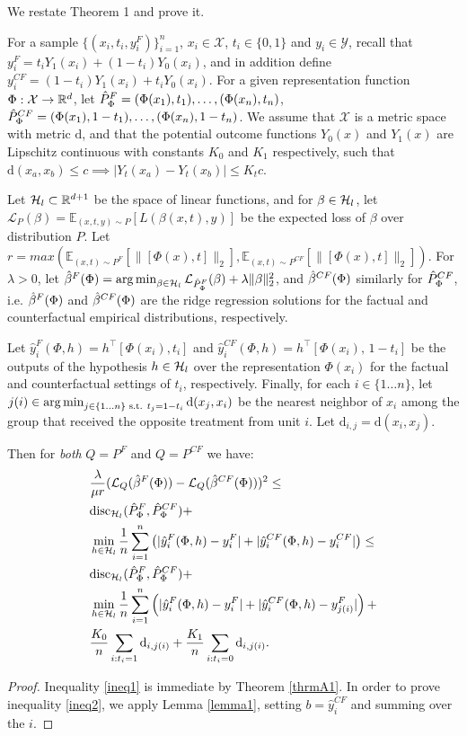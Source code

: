 We restate Theorem 1 and prove it.
\begin{apptheorem}
For a sample $\{(x_i,t_i,y_i^F)\}_{i=1}^n$,  $x_i \in \mathcal{X}$, $t_i \in \{0,1\}$ and $y_i \in \mathcal{Y} $,  recall that $y_i^F = t_i Y_1(x_i) + (1-t_i)Y_0(x_i)$, and in addition define $y_i^{CF} = (1-t_i) Y_1(x_i) + t_i Y_0(x_i)$. For a given representation function $\Phi :\mathcal{X} \rightarrow \mathbb{R}^d$, let $\hat{P}_\Phi^{F} = (\Phi(x_1), t_1),  \ldots, (\Phi(x_n), t_n)$, $\hat{P}_\Phi^{CF} = (\Phi(x_1), 1-t_1),  \ldots, (\Phi(x_n), 1-t_n) $. We assume that $\mathcal{X}$ is a metric space with metric $\mathrm{d}$, and that the potential outcome functions $Y_0(x)$  and $Y_1(x)$ are Lipschitz continuous with constants $K_0$ and $K_1$ respectively, such that $\mathrm{d}(x_a,x_b) \leq c \implies |Y_t(x_a) - Y_t(x_b)| \leq K_t c$.

Let $\mathcal{H}_l \subset\mathbb{R}^{d+1}$ be the space of linear functions, and
for $\beta \in \mathcal{H}_l$, let $\mathcal{L}_{P}(\beta) = \mathbb{E}_{(x,t,y) \sim P} \left[L(\beta(x,t),y)\right]$ be the expected loss of $\beta$ over distribution $P$. Let $r = max\left(\mathbb{E}_{(x,t) \sim P^F}\left[\|[\Phi(x), t]\|_2\right],\mathbb{E}_{(x,t) \sim P^{CF}}\left[\|[\Phi(x), t]\|_2\right]\right)$.
For $\lambda >0$, let $\hat{\beta}^F(\Phi) = \operatorname*{arg\,min}_{\beta \in \mathcal{H}_l} \mathcal{L}_{\hat{P}_\Phi^{F}}(\beta) + \lambda \|\beta\|_2^2$, and  $\hat{\beta}^{CF}(\Phi)$ similarly for $\hat{P}_\Phi^{CF}$, i.e. $\hat{\beta}^F(\Phi)$ and $\hat{\beta}^{CF}(\Phi)$ are the ridge regression solutions for the factual and counterfactual empirical distributions, respectively.

Let $\hat{y}_i^F(\Phi,h) = h^\top [\Phi(x_i) , t_i]$ and $\hat{y}_i^{CF}(\Phi,h) = h^\top [\Phi(x_i) , \, 1-t_i]$ be the outputs of the hypothesis $h \in \mathcal{H}_l$ over the representation $\Phi(x_i)$ for the factual and counterfactual settings of $t_i$, respectively. Finally, for each $i \in \{1 \ldots n\}$, let $j(i) \in \operatorname*{arg\,min}_{j \in \{1\ldots n\} \text{ s.t. } t_j = 1-t_i} \mathrm{d}(x_j,x_i)$ be the nearest neighbor of $x_i$ among the group that received the opposite treatment from unit $i$. Let $\mathrm{d}_{i,j} = \mathrm{d}(x_i,x_j)$.

Then for \emph{both} $Q = P^F$ and $Q=P^{CF}$ we have:
\begin{align}
&\frac{\lambda}{\mu r} (\mathcal{L}_{Q}(\hat{\beta}^F(\Phi))-\mathcal{L}_{Q}(\hat{\beta}^{CF}(\Phi)))^2 \leq \label{ineq1} \\
& \text{disc}_{\mathcal{H}_l}(\hat{P}_\Phi^{F},\hat{P}_\Phi^{CF})  + \nonumber\\
& \min_{h\in \mathcal{H}_l} \frac{1}{n} \sum_{i=1}^n \left( | \hat{y}_i^F(\Phi,h)- y_i^F |  + |\hat{y}_i^{CF}(\Phi,h)  - y_i^{CF}|\right)  \leq  \label{ineq2} \\
& \text{disc}_{\mathcal{H}_l}(\hat{P}_\Phi^{F},\hat{P}_\Phi^{CF}) +  \nonumber \\
& \min_{h\in \mathcal{H}_l} \frac{1}{n} \sum_{i=1}^n \left( | \hat{y}_i^F(\Phi,h)- y_i^F |  + |\hat{y}_i^{CF}(\Phi,h)  - y_{j(i)}^F|\right) + \nonumber\\
& \frac{K_0}{n} \sum_{i: t_i=1} \mathrm{d}_{i,j(i)} + \frac{K_1}{n} \sum_{i: t_i=0} \mathrm{d}_{i,j(i)}. \nonumber
\end{align}
\end{apptheorem}
\begin{proof}
Inequality \eqref{ineq1} is immediate by Theorem \ref{thrmA1}. In order to prove inequality \eqref{ineq2}, we apply Lemma \ref{lemma1}, setting $b = \hat{y}_i^{CF}$ and summing over the $i$.
\end{proof}




